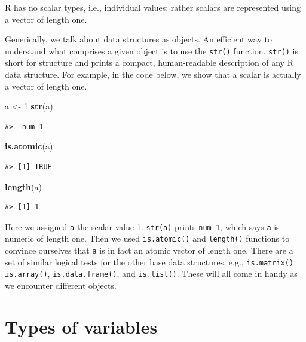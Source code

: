 \documentclass[
  11pt,
]{krantz}
\newenvironment{Shaded}{\begin{snugshade}}{\end{snugshade}}
\newcommand{\DecValTok}[1]{\textcolor[rgb]{0.00,0.00,0.81}{#1}}
\newcommand{\KeywordTok}[1]{\textcolor[rgb]{0.13,0.29,0.53}{\textbf{#1}}}
\newcommand{\NormalTok}[1]{#1}
\newcommand{\StringTok}[1]{\textcolor[rgb]{0.31,0.60,0.02}{#1}}
\theoremstyle{definition}
\theoremstyle{definition}
\theoremstyle{definition}
\theoremstyle{definition}
\theoremstyle{remark}
\begin{document}
R has no scalar types, i.e., individual values; rather scalars are represented using a vector of length one.

Generically, we talk about data structures as objects. An efficient way to understand what comprises a given object is to use the \texttt{str()} function. \texttt{str()} is short for structure and prints a compact, human-readable description of any R data structure. For example, in the code below, we show that a scalar is actually a vector of length one.

\begin{Shaded}
\begin{Highlighting}[]
\NormalTok{a \textless{}{-}}\StringTok{ }\DecValTok{1}
\KeywordTok{str}\NormalTok{(a)}
\end{Highlighting}
\end{Shaded}

\begin{verbatim}
#>  num 1
\end{verbatim}

\begin{Shaded}
\begin{Highlighting}[]
\KeywordTok{is.atomic}\NormalTok{(a)}
\end{Highlighting}
\end{Shaded}

\begin{verbatim}
#> [1] TRUE
\end{verbatim}

\begin{Shaded}
\begin{Highlighting}[]
\KeywordTok{length}\NormalTok{(a)}
\end{Highlighting}
\end{Shaded}

\begin{verbatim}
#> [1] 1
\end{verbatim}

Here we assigned \texttt{a} the scalar value 1. \texttt{str(a)} prints \texttt{num\ 1}, which says \texttt{a} is numeric of length one. Then we used \texttt{is.atomic()} and \texttt{length()} functions to convince ourselves that \texttt{a} is in fact an atomic vector of length one. There are a set of similar logical tests for the other base data structures, e.g., \texttt{is.matrix()}, \texttt{is.array()}, \texttt{is.data.frame()}, and \texttt{is.list()}. These will all come in handy as we encounter different objects.

\hypertarget{typesOfVariables}{%
\section{Types of variables}\label{typesOfVariables}}
\end{document}
